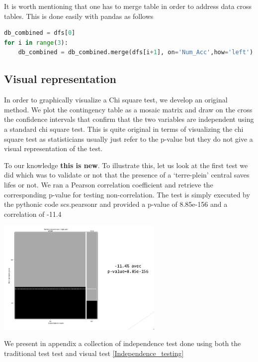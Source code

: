 \documentclass[a4paper]{article}
\theoremstyle{definition}
\theoremstyle{proposition}
\begin{document}
It is worth mentioning that one has to merge table in order to address data cross tables. This is done easily with pandas as follows
\begin{lstlisting}[language=Python]
db_combined = dfs[0]
for i in range(3):
    db_combined = db_combined.merge(dfs[i+1], on='Num_Acc',how='left')
\end{lstlisting}


\subsection{Visual representation}
In order to graphically visualize a Chi square test, we develop an original method. We plot the contingency table as a mosaic matrix and draw on the cross the confidence intervals that confirm that the two variables are independent using a standard chi square test. This is quite original in terms of visualizing the chi square test as statisticians usually just refer to the p-value but they do not give a visual representation of the test. 

To our knowledge \textbf{this is new}. 
To illustrate this, let us look at the first test we did which was to validate or not that the presence of a `terre-plein' central saves lifes or not. We ran a Pearson correlation coefficient and retrieve the corresponding p-value for testing non-correlation.
The test is simply executed by the pythonic code  scs.pearsonr and provided a p-value of 8.85e-156 and a correlation of -11.4%

\includegraphics[width=8cm]{indep_1_test.png}\label{indep_1_test}

We present in appendix a collection of independence test done using both the traditional test test and visual test \ref{Independence_testing}
\end{document}
